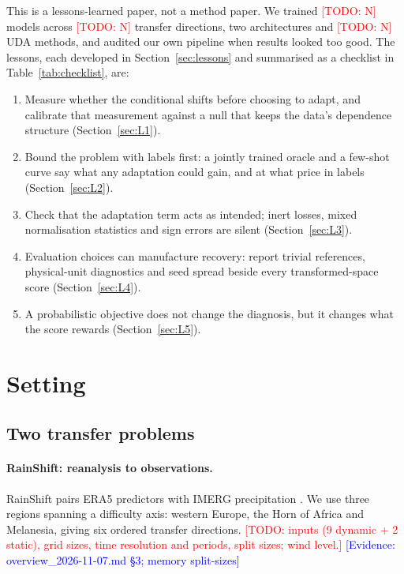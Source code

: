 \documentclass{article}
\newcommand{\todo}[1]{\textcolor{red}{[TODO: #1]}}
\newcommand{\ev}[1]{\textcolor{blue}{[Evidence: #1]}}
\begin{document}
This is a lessons-learned paper, not a method paper. We trained \todo{N}
models across \todo{N} transfer directions, two architectures and
\todo{N} UDA methods, and audited our own pipeline when results looked
too good. The lessons, each developed in Section~\ref{sec:lessons} and
summarised as a checklist in Table~\ref{tab:checklist}, are:
\begin{enumerate}
  \item Measure whether the conditional shifts before choosing to adapt,
        and calibrate that measurement against a null that keeps the
        data's dependence structure (Section~\ref{sec:L1}).
  \item Bound the problem with labels first: a jointly trained oracle and
        a few-shot curve say what any adaptation could gain, and at what
        price in labels (Section~\ref{sec:L2}).
  \item Check that the adaptation term acts as intended; inert losses,
        mixed normalisation statistics and sign errors are silent
        (Section~\ref{sec:L3}).
  \item Evaluation choices can manufacture recovery: report trivial
        references, physical-unit diagnostics and seed spread beside every
        transformed-space score (Section~\ref{sec:L4}).
  \item A probabilistic objective does not change the diagnosis, but it
        changes what the score rewards (Section~\ref{sec:L5}).
\end{enumerate}

\section{Setting}\label{sec:setting}

\subsection{Two transfer problems}\label{sec:data}

\paragraph{RainShift: reanalysis to observations.} RainShift
\citep{harder2025rainshift} pairs ERA5 predictors
\citep{hersbach2020era5} with IMERG precipitation
\citep{huffman2023imerg}. We use three regions spanning a difficulty
axis: western Europe, the Horn of Africa and Melanesia, giving six
ordered transfer directions. \todo{inputs (9 dynamic + 2 static), grid
sizes, time resolution and periods, split sizes; wind level.}
\ev{overview\_2026-11-07.md \S3; memory split-sizes}
\end{document}
